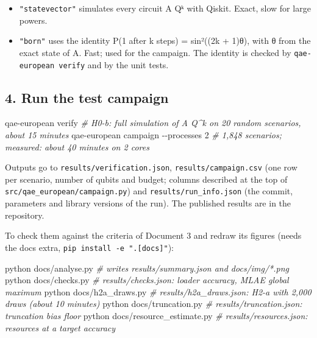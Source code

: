 \documentclass[
  10pt,
]{article}
\newenvironment{Shaded}{}{}
\newcommand{\AttributeTok}[1]{\textcolor[rgb]{0.49,0.56,0.16}{#1}}
\newcommand{\CommentTok}[1]{\textcolor[rgb]{0.38,0.63,0.69}{\textit{#1}}}
\newcommand{\ExtensionTok}[1]{#1}
\newcommand{\NormalTok}[1]{#1}
\providecommand{\tightlist}{%
  \setlength{\itemsep}{0pt}\setlength{\parskip}{0pt}}
\begin{document}
\begin{itemize}
\tightlist
\item
  \texttt{"statevector"} simulates every circuit A Qᵏ with Qiskit.
  Exact, slow for large powers.
\item
  \texttt{"born"} uses the identity P(1 after k steps) = sin²((2k +
  1)θ), with θ from the exact state of A. Fast; used for the campaign.
  The identity is checked by \texttt{qae-european\ verify} and by the
  unit tests.
\end{itemize}

\hypertarget{4-run-the-test-campaign}{%
\subsection{4. Run the test campaign}\label{4-run-the-test-campaign}}

\begin{Shaded}
\begin{Highlighting}[]
\ExtensionTok{qae{-}european}\NormalTok{ verify                         }\CommentTok{\# H0{-}b: full simulation of A Q\^{}k on 20 random scenarios, about 15 minutes}
\ExtensionTok{qae{-}european}\NormalTok{ campaign }\AttributeTok{{-}{-}processes}\NormalTok{ 2         }\CommentTok{\# 1,848 scenarios; measured: about 40 minutes on 2 cores}
\end{Highlighting}
\end{Shaded}

Outputs go to \texttt{results/verification.json},
\texttt{results/campaign.csv} (one row per scenario, number of qubits
and budget; columns described at the top of
\texttt{src/qae\_european/campaign.py}) and
\texttt{results/run\_info.json} (the commit, parameters and library
versions of the run). The published results are in the repository.

To check them against the criteria of Document 3 and redraw its figures
(needs the docs extra, \texttt{pip\ install\ -e\ ".{[}docs{]}"}):

\begin{Shaded}
\begin{Highlighting}[]
\ExtensionTok{python}\NormalTok{ docs/analyse.py                      }\CommentTok{\# writes results/summary.json and docs/img/*.png}
\ExtensionTok{python}\NormalTok{ docs/checks.py                       }\CommentTok{\# results/checks.json: loader accuracy, MLAE global maximum}
\ExtensionTok{python}\NormalTok{ docs/h2a\_draws.py                    }\CommentTok{\# results/h2a\_draws.json: H2{-}a with 2,000 draws (about 10 minutes)}
\ExtensionTok{python}\NormalTok{ docs/truncation.py                   }\CommentTok{\# results/truncation.json: truncation bias floor}
\ExtensionTok{python}\NormalTok{ docs/resource\_estimate.py            }\CommentTok{\# results/resources.json: resources at a target accuracy}
\end{Highlighting}
\end{Shaded}
\end{document}
